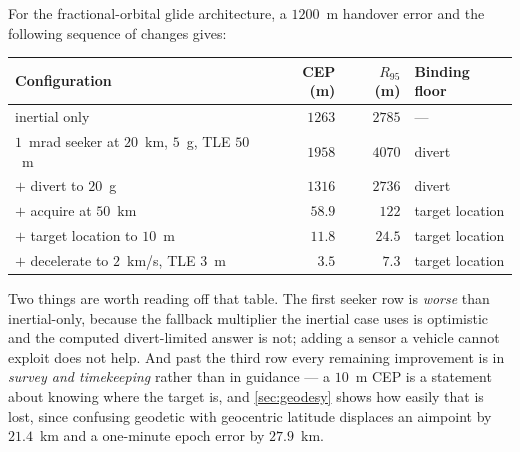 \documentclass[11pt,a4paper]{article}
\theoremstyle{definition}
\numberwithin{equation}{section}
\begin{document}
For the fractional-orbital glide architecture, a $1200$~m handover error and the following sequence of changes gives:

\begin{center}
\begin{tabular}{@{}lrrl@{}}
\toprule
\textbf{Configuration} & \textbf{CEP (m)} & \textbf{$R_{95}$ (m)} & \textbf{Binding floor} \\
\midrule
inertial only & $1263$ & $2785$ & --- \\
$1$~mrad seeker at $20$~km, $5$~g, TLE $50$~m & $1958$ & $4070$ & divert \\
$+$ divert to $20$~g & $1316$ & $2736$ & divert \\
$+$ acquire at $50$~km & $58.9$ & $122$ & target location \\
$+$ target location to $10$~m & $11.8$ & $24.5$ & target location \\
$+$ decelerate to $2$~km/s, TLE $3$~m & $3.5$ & $7.3$ & target location \\
\bottomrule
\end{tabular}
\end{center}

Two things are worth reading off that table. The first seeker row is \emph{worse} than inertial-only, because the fallback multiplier the inertial case uses is optimistic and the computed divert-limited answer is not; adding a sensor a vehicle cannot exploit does not help. And past the third row every remaining improvement is in \emph{survey and timekeeping} rather than in guidance --- a $10$~m CEP is a statement about knowing where the target is, and \cref{sec:geodesy} shows how easily that is lost, since confusing geodetic with geocentric latitude displaces an aimpoint by $21.4$~km and a one-minute epoch error by $27.9$~km.
\end{document}
